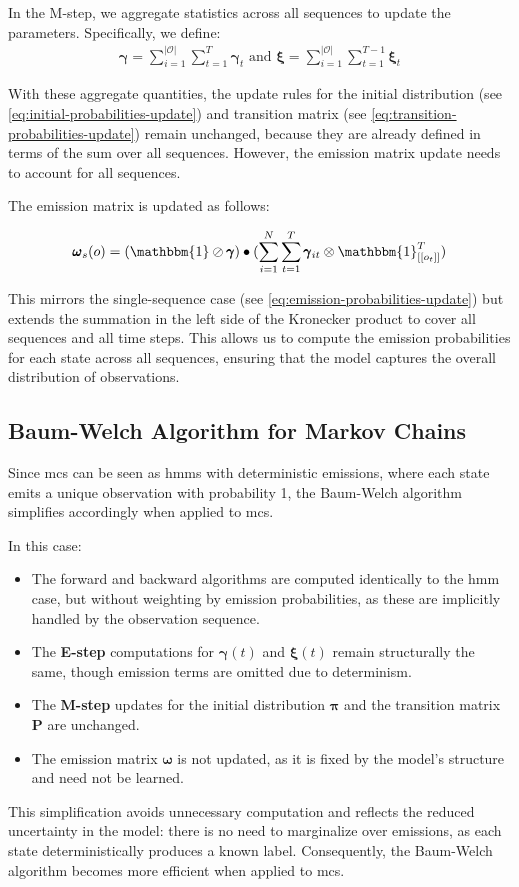 In the M-step, we aggregate statistics across all sequences to update the parameters.
Specifically, we define:
\begin{align}
    \pmb{\gamma} = \sum_{i=1}^{|\mathcal{O}|}\sum_{t=1}^{T} \pmb{\gamma}_t
    \text{ and }
    \pmb{\xi} = \sum_{i=1}^{|\mathcal{O}|}\sum_{t=1}^{T-1} \pmb{\xi}_t
\end{align}

With these aggregate quantities, the update rules for the initial distribution (see \autoref{eq:initial-probabilities-update}) and transition matrix (see \autoref{eq:transition-probabilities-update}) remain unchanged, because they are already defined in terms of the sum over all sequences.
However, the emission matrix update needs to account for all sequences.

The emission matrix is updated as follows:


\begin{equation}
    \pmb{\omega}
    _s(o) = (\mathbbm{1} \oslash \pmb{\gamma}) \bullet (\sum_{i=1}^N \sum_{t=1}^{T} \pmb{\gamma}_{it} \otimes \mathbbm{1}_{[[o_t]]}^{T})
    \label{eq:omega-update}
\end{equation}


This mirrors the single-sequence case (see \autoref{eq:emission-probabilities-update}) but extends the summation in the left side of the Kronecker product to cover all sequences and all time steps.
This allows us to compute the emission probabilities for each state across all sequences, ensuring that the model captures the overall distribution of observations.

\subsection{Baum-Welch Algorithm for Markov Chains}\label{subsec:baum-welch-mc}
Since \glspl{mc} can be seen as \glspl{hmm} with deterministic emissions, where each state emits a unique observation with probability 1, the Baum-Welch algorithm simplifies accordingly when applied to \glspl{mc}.

In this case:

\begin{itemize}
    \item The forward and backward algorithms are computed identically to the \gls{hmm} case, but without weighting by emission probabilities, as these are implicitly handled by the observation sequence.
    \item The \textbf{E-step} computations for $\pmb{\gamma}(t)$ and $\pmb{\xi}(t)$ remain structurally the same, though emission terms are omitted due to determinism.
    \item The \textbf{M-step} updates for the initial distribution $\pmb{\pi}$ and the transition matrix $\pmb{P}$ are unchanged.
    \item The emission matrix $\pmb{\omega}$ is not updated, as it is fixed by the model's structure and need not be learned.
\end{itemize}

This simplification avoids unnecessary computation and reflects the reduced uncertainty in the model: there is no need to marginalize over emissions, as each state deterministically produces a known label.
Consequently, the Baum-Welch algorithm becomes more efficient when applied to \glspl{mc}.
